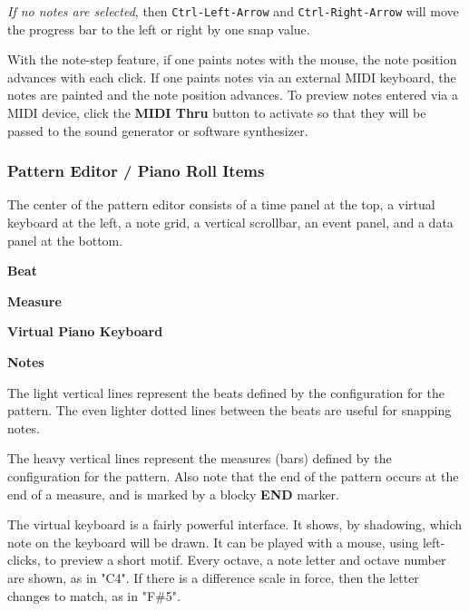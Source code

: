    \textsl{If no notes are selected}, then \texttt{Ctrl-Left-Arrow}
   and \texttt{Ctrl-Right-Arrow} will move the progress bar to the left or
   right by one snap value.

   With the note-step feature, if one paints notes with the mouse,
   the note position advances with each click.
   If one paints notes via an external MIDI keyboard, the notes are painted and
   the note position advances.
   To preview notes entered via a MIDI device, click the
   \textbf{MIDI Thru} button to activate so that they will be
   passed to the sound generator or software synthesizer.

\subsubsection{Pattern Editor / Piano Roll Items}
\label{subsubsec:pattern_editor_piano_roll_items}

   The center of the pattern editor consists of a time panel at the top,
   a virtual keyboard at the left, a note grid, a vertical scrollbar, an event
   panel, and a data panel at the bottom.

   \begin{enumber}
      \item \textbf{Beat}
      \item \textbf{Measure}
      \item \textbf{Virtual Piano Keyboard}
      \item \textbf{Notes}
   \end{enumber}

   \setcounter{ItemCounter}{0}      %

   The light vertical lines represent the beats defined by the configuration
   for the pattern.  The even lighter dotted lines between the beats are useful
   for snapping notes.

   The heavy vertical lines represent the measures (bars) defined by the
   configuration for the pattern.
   Also note that the end of the pattern
   occurs at the end of a measure, and is marked by a blocky \textbf{END}
   marker.

   The virtual keyboard is a fairly powerful interface.  It shows,
   by shadowing, which note on the keyboard will be drawn. It can be
   played with a mouse, using left-clicks, to preview a short motif.
   Every octave, a note letter and octave number are shown, as in
   "C4".  If there is a difference scale in force, then the letter changes to
   match, as in "F\#5".

